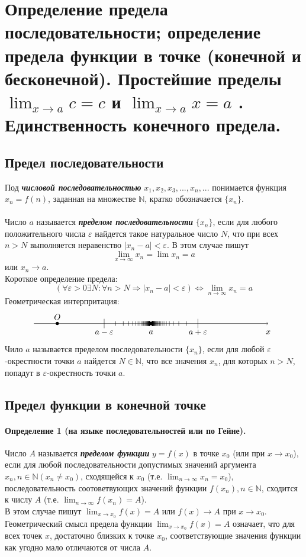 \documentclass[12pt, fleqn]{article}
\begin{document}
	\section{Определение предела последовательности; определение предела функции в точке (конечной и бесконечной). Простейшие пределы $\lim_{x\to a} c=c$ и $\lim_{x \to a} x=a$ . Единственность конечного предела.}
	\subsection{Предел последовательности}
	Под \textbf{\textit{числовой последовательностью}} $x_1, x_2, x_3,...,x_n,...$ понимается функция $x_n = f(n)$, заданная на множестве $\mathbb{N}$, кратко обозначается $\{x_n\}$.\\\\
	Число $a$ называется \textbf{\textit{пределом последовательности}} $\{x_n\}$, если для любого положительного числа $\varepsilon$ найдется такое натуральное число $N$, что при всех $n>N$ выполняется неравенство $|x_n-a|<\varepsilon$. 
	В этом случае пишут $$\lim_{x\to \infty} x_n=\lim x_n=a$$ или $x_n \to a$.\\
	Короткое определение предела:
	$$\left( \forall \varepsilon > 0  \exists N \colon \forall n > N \Longrightarrow \left|x_n-a \right| < \varepsilon \right) \Longleftrightarrow \lim_{n\to\infty}x_n=a $$
	Геометрическая интерпритация:
	$$\begin{tikzpicture}
		\draw 
		(3,0.2)--(3,-0.2) node[below=-2]{$a-\varepsilon$}
		(7,0.2)--(7,-0.2) node[below=-2]{$a+\varepsilon$}
		\foreach \x in {70,68.5 , ..., 10.5}{
				(5+200/\x^2,0.1)--(5+200/\x^2,-0.1) 
				(5-200/\x^2,0.1)--(5-200/\x^2,-0.1) 
			}
		[->] (0,0) -- (10,0) node[below=5] {$x$} coordinate(x axis);
		\fill (1, 0) circle (2pt) node[above=1] {$O$}
		(5,0) circle (2pt) node [below=5]{$a$};
	\end{tikzpicture}$$
	Чило $a$ называется пределом последовательности $\{x_n\}$, если для любой $\varepsilon$-окрестности точки $a$ найдется $N \in \mathbb{N}$, что все значения $x_n$, для которых $n > N$, попадут в $\varepsilon$-окрестность точки $a$.
	\subsection{Предел функции в конечной точке}
	\paragraph{Определение 1 (на языке последовательностей или по Гейне).} Число $A$ называется \textbf{\textit{пределом функции}} $y=f(x)$ в точке $x_0$ (или при $x \to x_0$), если для любой последовательности допустимых значений аргумента $x_n, n \in \mathbb{N} (x_n \neq x_0)$, сходящейся к $x_0$ (т.е. $\lim_{n \to \infty}x_n=x_0$), последовательность соотоветвующих значений функции $f(x_n), n \in \mathbb{N}$, сходится к числу $A$ (т.е. $\lim_{n \to \infty}f(x_n)=A$).\\
	В этом случае пишут $\lim_{x\to x_0}f(x)=A$ или $f(x) \to A $ при $x \to x_0$. Геометрический смысл предела функции $\lim_{x \to x_0}f(x) = A$ означает, что для всех точек $x$, достаточно близких к точке $x_0$, соответствующие значения функции как угодно мало отличаются от числа $A$.
\end{document}
